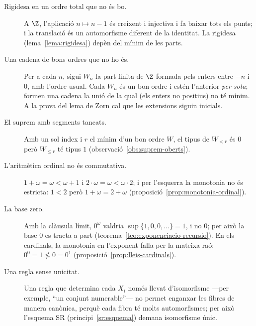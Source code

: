 \begin{description}
\item[Rigidesa en un ordre total que no és bo.] A \(\Z\), l'aplicació
\(n\mapsto n-1\) és creixent i injectiva i fa baixar tots els punts; i la
translació és un automorfisme diferent de la identitat. La rigidesa
(lema~\ref{lema:rigidesa}) depèn del mínim de les parts.

\item[Una cadena de bons ordres que no ho és.] Per a cada \(n\),
sigui \(W_n\) la part finita de \(\Z\) formada pels enters entre \(-n\) i
\(0\), amb l'ordre usual. Cada \(W_n\) és un bon ordre i estén l'anterior
\emph{per sota}; formen una cadena la unió de la qual (els enters no positius) no té
mínim. A la prova del lema de Zorn cal que les extensions siguin inicials.

\item[El suprem amb segments tancats.] Amb un sol índex i \(r\) el mínim
d'un bon ordre \(W\), el tipus de \(W_{<r}\) és \(0\) però \(W_{\le r}\) té
tipus \(1\) (observació~\ref{obs:suprem-oberts}).

\item[L'aritmètica ordinal no és commutativa.] \(1+\omega=\omega<\omega+1\)
i \(2\cdot\omega=\omega<\omega\cdot2\); i per l'esquerra la monotonia no és
estricta: \(1<2\) però \(1+\omega=2+\omega\)
(proposició~\ref{prop:monotonia-ordinal}).

\item[La base zero.] Amb la clàusula límit, \(0^\omega\) valdria
\(\sup\{1,0,0,\dots\}=1\), i no \(0\); per això la base \(0\) es tracta a
part (teorema~\ref{teo:exponenciacio-recursio}). En els cardinals, la
monotonia en l'exponent falla per la mateixa raó: \(0^0=1\not\le0=0^1\)
(proposició~\ref{prop:lleis-cardinals}).

\item[Una regla sense unicitat.] Una regla que determina cada \(X_i\) només
llevat d'isomorfisme ---per exemple, \enquote{un conjunt numerable}--- no
permet enganxar les fibres de manera canònica, perquè cada fibra té molts
automorfismes; per això l'esquema SR (principi~\ref{sr:esquema}) demana
isomorfisme únic.
\end{description}
